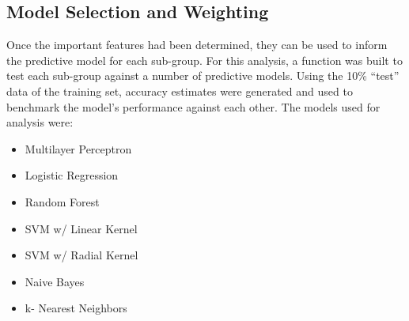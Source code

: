 \documentclass[
]{article}
\providecommand{\tightlist}{%
  \setlength{\itemsep}{0pt}\setlength{\parskip}{0pt}}
\begin{document}
\hypertarget{model-selection-and-weighting}{%
\subsection{Model Selection and Weighting}\label{model-selection-and-weighting}}

Once the important features had been determined, they can be used to inform the predictive model for each sub-group.
For this analysis, a function was built to test each sub-group against a number of predictive models. Using the 10\% ``test'' data of the training set, accuracy estimates were generated and used to benchmark the model's performance against each other. The models used for analysis were:

\begin{itemize}
\tightlist
\item
  Multilayer Perceptron\\
\item
  Logistic Regression\\
\item
  Random Forest\\
\item
  SVM w/ Linear Kernel\\
\item
  SVM w/ Radial Kernel
\item
  Naive Bayes\\
\item
  k- Nearest Neighbors
\end{itemize}
\end{document}
